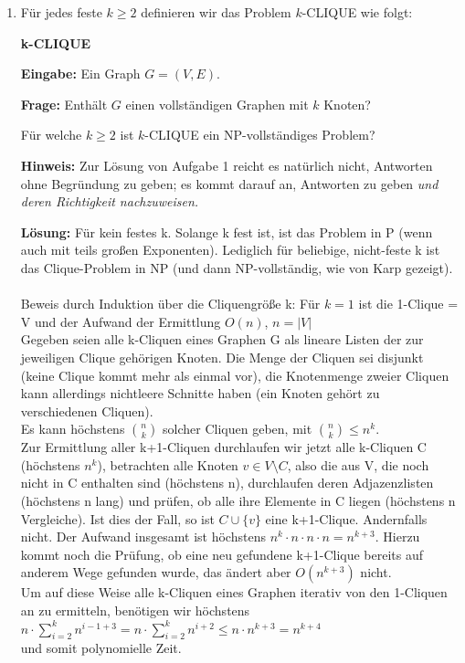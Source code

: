 \documentclass[12pt,a4paper]{scrartcl}
\newcommand{\prob}[1]{\vspace{.5\baselineskip}\begin{addmargin}[15pt]{0pt}\textbf{#1}\end{addmargin}}
\newcommand{\ein}[1]{\vspace{.5\baselineskip}\begin{addmargin}[15pt]{0pt}\textbf{Eingabe: }#1\end{addmargin}}
\newcommand{\fra}[1]{\vspace{.5\baselineskip}\begin{addmargin}[15pt]{0pt}\textbf{Frage: }#1\end{addmargin}}
\newcommand{\loesung}[1]{\vspace{.5\baselineskip}\begin{addmargin}[0pt]{0pt}\textbf{Lösung: }#1\end{addmargin}}
\begin{document}
\begin{enumerate}
\begin{enumerate}
{					}
	\item Für jedes feste $k \geq 2$ definieren wir das Problem $k$-CLIQUE wie folgt:
	\prob{k-CLIQUE}
	\ein{Ein Graph $G = (V,E)$.}
	\fra{Enthält $G$ einen vollständigen Graphen mit $k$ Knoten?}
	Für welche $k\geq 2$ ist $k$-CLIQUE ein NP-vollständiges Problem?
	
	\textbf{Hinweis:} Zur Lösung von Aufgabe 1 reicht es natürlich nicht, Antworten ohne Begründung zu geben; es kommt darauf an, Antworten zu geben \emph{und deren Richtigkeit nachzuweisen.}
	
	\loesung{Für kein festes k. Solange k fest ist, ist das Problem in P (wenn auch mit teils großen Exponenten). Lediglich für beliebige, nicht-feste k ist das Clique-Problem in NP (und dann NP-vollständig, wie von Karp gezeigt).\\ \\
	Beweis durch Induktion über die Cliquengröße k:
	Für $k = 1$ ist die 1-Clique = V und der Aufwand der Ermittlung $O(n)$, $n = |V|$\\
	Gegeben seien alle k-Cliquen eines Graphen G als lineare Listen der zur jeweiligen Clique gehörigen Knoten. Die Menge der Cliquen sei disjunkt (keine Clique kommt mehr als einmal vor), die Knotenmenge zweier Cliquen kann allerdings nichtleere Schnitte haben (ein Knoten gehört zu verschiedenen Cliquen).\\
	Es kann höchstens $n \choose k$ solcher Cliquen geben, mit ${n \choose k} \leq n^k$.\\
	Zur Ermittlung aller k+1-Cliquen durchlaufen wir jetzt alle k-Cliquen C (höchstens $n^k$), betrachten alle Knoten $v \in V \setminus C$, also die aus V, die noch nicht in C enthalten sind (höchstens n), durchlaufen deren Adjazenzlisten (höchstens n lang) und prüfen, ob alle ihre Elemente in C liegen (höchstens n Vergleiche). Ist dies der Fall, so ist $C \cup \{v\}$ eine k+1-Clique. Andernfalls nicht. Der Aufwand insgesamt ist höchstens $n^k \cdot n \cdot n \cdot n = n^{k+3}$. Hierzu kommt noch die Prüfung, ob eine neu gefundene k+1-Clique bereits auf anderem Wege gefunden wurde, das ändert aber $O(n^{k+3})$ nicht.\\
	Um auf diese Weise alle k-Cliquen eines Graphen iterativ von den 1-Cliquen an zu ermitteln, benötigen wir höchstens\\
	$n \cdot \sum_{i=2}^k n^{i-1+3} = n \cdot \sum_{i=2}^k n^{i+2} \leq n \cdot n^{k+3} = n^{k+4}$\\
	und somit polynomielle Zeit.\\ \\
	}
	\end{enumerate}


\end{enumerate}
\end{document}
